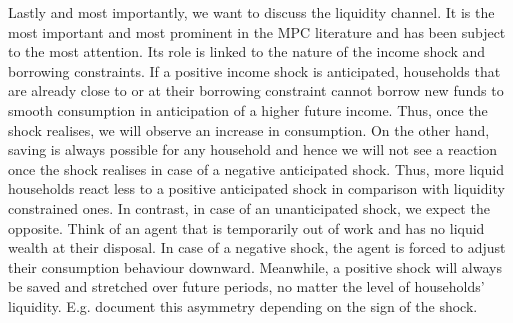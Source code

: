 Lastly and most importantly, we want to discuss the liquidity channel. It is the most important and most prominent in the MPC literature and has been subject to the most attention. Its role is linked to the nature of the income shock and borrowing constraints. If a positive income shock is anticipated, households that are already close to or at their borrowing constraint cannot borrow new funds to smooth consumption in anticipation of a higher future income. Thus, once the shock realises, we will observe an increase in consumption. On the other hand, saving is always possible for any household and hence we will not see a reaction once the shock realises in case of a negative anticipated shock. Thus, more liquid households react less to a positive anticipated shock in comparison with liquidity constrained ones. In contrast, in case of an unanticipated shock, we expect the opposite. Think of an agent that is temporarily out of work and has no liquid wealth at their disposal. In case of a negative shock, the agent is forced to adjust their consumption behaviour downward. Meanwhile, a positive shock will always be saved and stretched over future periods, no matter the level of households' liquidity. E.g. \cite{bunn_etal} document this asymmetry depending on the sign of the shock. \\
